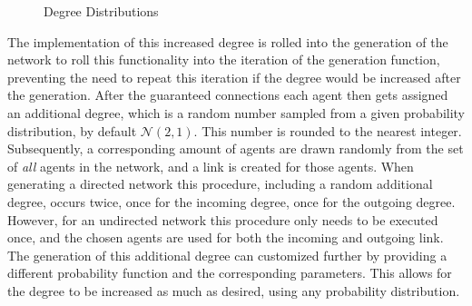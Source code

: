 \documentclass{article}
\begin{document}
\begin{figure}[!htbp]
  \centering
  \hfill
  \caption{Degree Distributions}
\end{figure}

\newpage

The implementation of this increased degree is rolled into the generation of the network to roll this functionality into the iteration of the generation function, preventing the need to repeat this iteration if the degree would be increased after the generation. After the guaranteed connections each agent then gets assigned an additional degree, which is a random number sampled from a given probability distribution, by default $\mathcal{N}(2,1)$. This number is rounded to the nearest integer. Subsequently, a corresponding amount of agents are drawn randomly from the set of \emph{all} agents in the network, and a link is created for those agents. When generating a directed network this procedure, including a random additional degree, occurs twice, once for the incoming degree, once for the outgoing degree. However, for an undirected network this procedure only needs to be executed once, and the chosen agents are used for both the incoming and outgoing link. \newline
The generation of this additional degree can customized further by providing a different probability function and the corresponding parameters. This allows for the degree to be increased as much as desired, using any probability distribution.\newline
\end{document}
